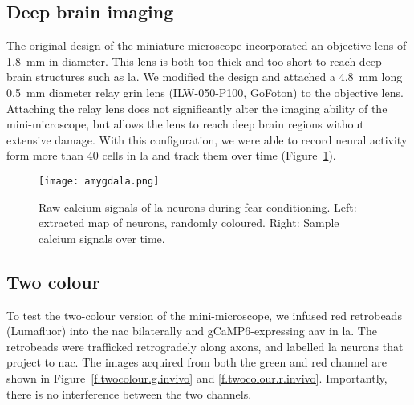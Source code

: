 \subsection{Deep brain imaging}
The original design of the miniature microscope incorporated an objective lens of \SI{1.8}{\mm} in diameter. This lens is both too thick and too short to reach deep brain structures such as \gls{la}. We modified the design and attached a \SI{4.8}{\mm} long \SI{0.5}{\mm} diameter relay \gls{grin} lens (ILW-050-P100, GoFoton) to the objective lens. Attaching the relay lens does not significantly alter the imaging ability of the mini-microscope, but allows the lens to reach deep brain regions without extensive damage. With this configuration, we were able to record neural activity form more than 40 cells in \gls{la} and track them over time (Figure~\ref{f.amygdala}).
\begin{figure}[h]
    \centering
    \texttt{[image: amygdala.png]}
    \caption[Calcium imaging in \gls{la} during fear conditioning.]{Raw calcium signals of \gls{la} neurons during fear conditioning. Left: extracted map of neurons, randomly coloured. Right: Sample calcium signals over time.\label{f.amygdala}}

\end{figure}

\subsection{Two colour}
To test the two-colour version of the mini-microscope, we infused red retrobeads (Lumafluor) into the \gls{nac} bilaterally and gCaMP6-expressing \gls{aav} in \gls{la}. The retrobeads were trafficked retrogradely along axons, and labelled \gls{la} neurons that project to \gls{nac}. The images acquired from both the green and red channel are shown in Figure~\ref{f.twocolour.g.invivo} and \ref{f.twocolour.r.invivo}. Importantly, there is no interference between the two channels.

